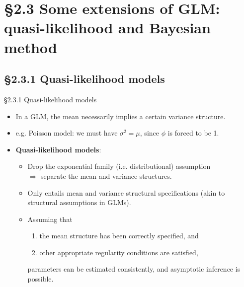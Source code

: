 \documentclass{beamer}
\newcommand{\currentsection}{}
\let\oldsection\section
\renewcommand{\section}[1]{\oldsection{#1}\renewcommand{\currentsection}{#1}}
\newcommand{\currentsubsection}{}
\let\oldsubsection\subsection
\renewcommand{\subsection}[1]{\oldsubsection{#1}\renewcommand{\currentsubsection}{#1}}
\newenvironment{wideitemize}%
  {\begin{itemize}%
    \setlength{\parskip}{1em}}%
  {\end{itemize}}
\begin{document}
\section{\S2.3 Some extensions of GLM: quasi-likelihood and Bayesian method}
\subsection{\S2.3.1 Quasi-likelihood models}
\begin{frame}{\S2.3.1 Quasi-likelihood models}
\begin{wideitemize}
\item In a GLM, the mean  necessarily implies a certain variance structure. 

\item e.g. Poisson model: we must have $\sigma^2 = \mu $, since $\phi$ is forced to be 1. 
\item
{\bf Quasi-likelihood models}: 

\begin{wideitemize}
\item 
Drop the exponential family (i.e. distributional) assumption\\
 $\Rightarrow$ separate the mean and
variance structures.



\item Only entails  mean and variance structural specifications (akin to structural assumptions in GLMs). 


\item Assuming that
\begin{enumerate}
\item the mean structure has been correctly specified, and
\item other appropriate regularity conditions are satisfied,
\end{enumerate}
parameters can  be estimated consistently,
and asymptotic inference is possible.

\end{wideitemize}
\end{wideitemize}
\end{frame}
\end{document}

